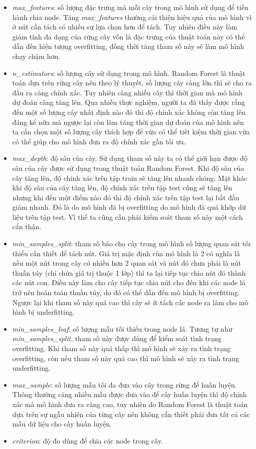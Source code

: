 \documentclass[conference]{IEEEtran}
\begin{document}
\begin{itemize}
\item \emph{max\_features}: số lượng đặc trưng mà mỗi cây trong mô hình sử dụng để tiến hành chia node. Tăng \emph{max\_features} thường cải thiện hiệu quả của mô hình vì ở nút cần tách có nhiều sự lựa chọn hơn để tách. Tuy nhiên điều này làm giảm tính đa dạng của rừng cây vốn là đặc trưng của thuật toán này có thể dẫn đến hiện tượng overfitting, đồng thời tăng tham số này sẽ làm mô hình chạy chậm hơn.
\item \emph{n\_estimators}: số lượng cây sử dụng trong mô hình. Random Forest là thuật toán dựa  trên rừng cây nên theo lý thuyết, số lượng cây càng lớn thì sẽ cho ra đầu ra càng chính xác. Tuy nhiên càng nhiều cây thì thời gian mà mô hình dự đoán càng tăng lên. Qua nhiều thực nghiệm, người ta đã thấy được rằng đến một số lượng cây nhất định nào đó thì độ chính xác không còn tăng lên đáng kể nữa mà ngược lại còn làm tăng thời gian dự đoán của mô hình nên ta cần chọn một số lượng cây thích hợp để vừa có thể tiết kiệm thời gian vừa có thể giúp cho mô hình đưa ra độ chính xác gần tối ưu.
\item \emph{max\_depth}: độ sâu của cây. Sử dụng tham số này ta có thể giới hạn được độ sâu của cây được sử dụng trong thuật toán Random Forest. Khi độ sâu của cây tăng lên, độ chính xác trên tập train sẽ tăng lên nhanh chóng. Mặt khác khi độ sâu của cây tăng lên, độ chính xác trên tập test cũng sẽ tăng lên nhưng khi đến một điểm nào đó thì độ chính xác trên tập test lại bắt đầu giảm nhanh. Đó là do mô hình đã bị overfitting do mô hình đã quá khớp dữ liệu trên tập test. Vì thế ta cũng cần phải kiểm soát tham số này một cách cẩn thận.
\item \emph{min\_samples\_split}: tham số báo cho cây trong mô hình số lượng quan sát tối thiểu cần thiết để tách nút. Giá trị mặc định của mô hình là 2 có nghĩa là nếu một nút trong cây có nhiều hơn 2 quan sát và nút đó chưa phải là nút thuần túy (chỉ chứa giá trị thuộc 1 lớp) thì ta lại tiếp tục chia nút đó thành các nút con. Điều này làm cho cây tiếp tục chia nút cho đến khi các node lá trở nên hoàn toàn thuần túy, do đó có thể dẫn đến mô hình bị overfitting. Ngược lại khi tham số này quá cao thì cây sẽ ít tách các node ra làm cho mô hình bị underfitting.
\item \emph{min\_samples\_leaf}: số lượng mẫu tối thiểu trong node lá. Tương tự như \emph{min\_samples\_split}, tham số này được dùng để kiểm soát tình trạng overfitting. Khi tham số này quá thấp thì mô hình sẽ xảy ra tình trạng overfitting, còn nếu tham số này quá cao thì mô hình sẽ xảy ra tình trạng underfitting.
\item \emph{max\_sample}: số lượng mẫu tối đa đưa vào cây trong rừng để huấn luyện. Thông thường càng nhiều mẫu được đưa vào để cây huấn luyện thì độ chính xác mà mô hình đưa ra càng cao, tuy nhiên do Random Forest là thuật toán dựa trên sự ngẫu nhiên của từng cây nên không cần thiết phải đưa tất cả các mẫu dữ liệu cho cây huấn luyện.
\item \emph{criterion}: độ đo dùng để chia các node trong cây.
\end{itemize}
\end{document}
